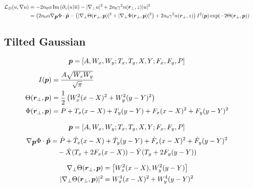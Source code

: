 \begin{equation}
\begin{split}
    \mathcal{L}_{D}(u,\nabla u) &= -2 n_0 \alpha\, \mathrm{Im}\left(\partial_{z}(u) \overline{u}\right) - |\nabla_{\perp} u|^2 + 2n_0 \gamma^2 n(\vect{r}_{\perp},z) |u|^2 \\
    & = \left(2 n_0 \alpha \nabla_{\vect{p}}{\Phi}\cdot\vect{\dot{p}} - \left(|\nabla_{\perp}\Theta(\vect{r}_{\perp},\vect{p})|^2 + |\nabla_{\perp}\Phi(\vect{r}_{\perp},\vect{p})|^2 \right) + 2n_0 \gamma^2 n(\vect{r}_{\perp},z)\right) I^2(\vect{p})\exp{-2 \Theta(\vect{r}_{\perp},\vect{p})}
\end{split}
\end{equation}

\subsection{Tilted Gaussian}
\begin{equation}
    \mbox{\boldmath{$p$}} = \left[A, W_x,W_y; T_x, T_y, X, Y; F_x,F_y, P\right]
\end{equation}
\begin{equation}
    \begin{split}
        I(\mbox{\boldmath{$p$}}) &= \frac{A \sqrt{W_x W_y}}{\sqrt{\pi}} \\
        \Theta(\mbox{\boldmath{$r$}}_{\perp},\mbox{\boldmath{$p$}}) &= \frac{1}{2} \left( W_x^2(x-X)^2 + W_y^2(y-Y)^2 \right) \\
        \Phi(\mbox{\boldmath{$r$}}_{\perp},\mbox{\boldmath{$p$}}) &= P + T_x (x-X) + T_y (y-Y) + F_x (x-X)^2 + F_{y} (y-Y)^2
    \end{split}
\end{equation}




\begin{equation}
    \mbox{\boldmath{$p$}} = \left[A, W_x,W_y; T_x, T_y, X, Y; F_x,F_y, P\right]
\end{equation}
\begin{equation}
    \begin{split}
        \nabla_{\mbox{\boldmath{$p$}}}{\Phi}\cdot\mbox{\boldmath{$\dot{p}$}} &= \dot{P} + \dot{T}_x (x-X) + \dot{T}_y (y-Y) + \dot{F}_{x} (x-X)^2 + \dot{F}_{y} (y-Y)^2 \\
        &\quad - \dot{X} (T_x + 2F_x(x-X)) - \dot{Y} (T_y + 2F_y(y-Y)) \\
    \end{split}
\end{equation}

\begin{equation}
    \begin{split}
        \nabla_{\perp}\Theta(\mbox{\boldmath{$r$}}_{\perp},\mbox{\boldmath{$p$}}) &= \left[ W_x^2 (x-X),  W_y^2 (y-Y) \right] \\
        |\nabla_{\perp}\Theta(\mbox{\boldmath{$r$}}_{\perp},\mbox{\boldmath{$p$}})|^2 &= W_x^4 (x-X)^2 +  W_y^4 (y-Y)^2 \\
    \end{split}
\end{equation}


